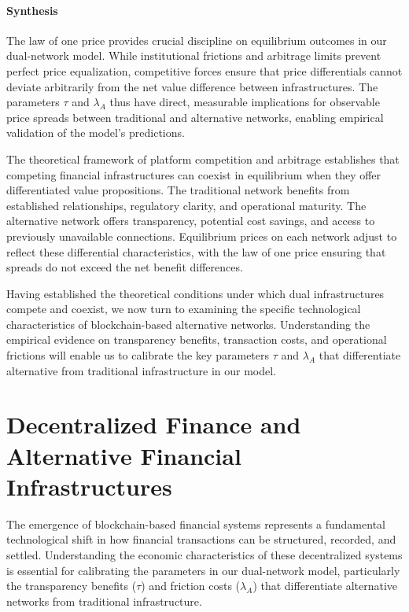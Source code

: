 \paragraph{Synthesis}

The law of one price provides crucial discipline on equilibrium outcomes in our dual-network model. While institutional frictions and arbitrage limits prevent perfect price equalization, competitive forces ensure that price differentials cannot deviate arbitrarily from the net value difference between infrastructures. The parameters $\tau$ and $\lambda_A$ thus have direct, measurable implications for observable price spreads between traditional and alternative networks, enabling empirical validation of the model's predictions.

The theoretical framework of platform competition and arbitrage establishes that competing financial infrastructures can coexist in equilibrium when they offer differentiated value propositions. The traditional network benefits from established relationships, regulatory clarity, and operational maturity. The alternative network offers transparency, potential cost savings, and access to previously unavailable connections. Equilibrium prices on each network adjust to reflect these differential characteristics, with the law of one price ensuring that spreads do not exceed the net benefit differences.

Having established the theoretical conditions under which dual infrastructures compete and coexist, we now turn to examining the specific technological characteristics of blockchain-based alternative networks. Understanding the empirical evidence on transparency benefits, transaction costs, and operational frictions will enable us to calibrate the key parameters $\tau$ and $\lambda_A$ that differentiate alternative from traditional infrastructure in our model.


\section{Decentralized Finance and Alternative Financial Infrastructures}

The emergence of blockchain-based financial systems represents a fundamental technological shift in how financial transactions can be structured, recorded, and settled. Understanding the economic characteristics of these decentralized systems is essential for calibrating the parameters in our dual-network model, particularly the transparency benefits ($\tau$) and friction costs ($\lambda_A$) that differentiate alternative networks from traditional infrastructure.

